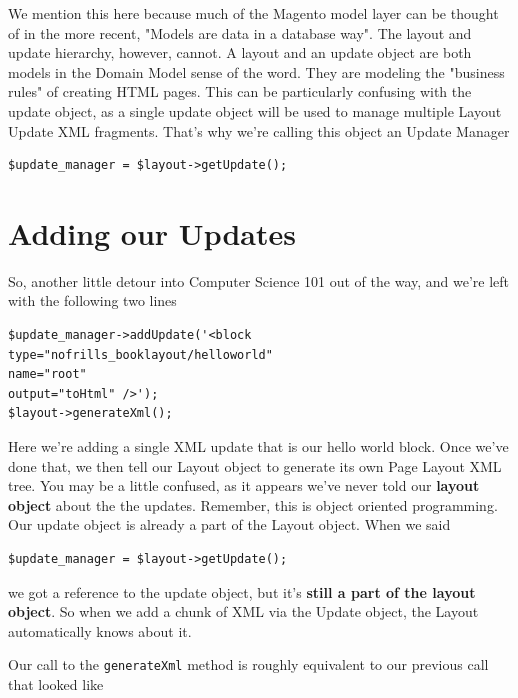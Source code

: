 \documentclass[oneside]{book}
\begin{document}
We mention this here because much of the Magento model layer can be thought of in the more recent, "Models are data in a database way".  The layout and update hierarchy, however, cannot.  A layout and an update object are both models in the Domain Model sense of the word.  They are modeling the "business rules" of creating HTML pages.  This can be particularly confusing with the update object, as a single update object will be used to manage multiple Layout Update XML fragments.  That's why we're calling this object an Update Manager

\begin{lstlisting}
$update_manager = $layout->getUpdate();         

\end{lstlisting}


\section{Adding our Updates}

So, another little detour into Computer Science 101 out of the way, and we're left with the following two lines

\begin{lstlisting}
$update_manager->addUpdate('<block 
type="nofrills_booklayout/helloworld" 
name="root" 
output="toHtml" />');           
$layout->generateXml();

\end{lstlisting}


Here we're adding a single XML update that is our hello world block.  Once we've done that, we then tell our Layout object to generate its own Page Layout XML tree.  You may be a little confused, as it appears we've never told our \textbf{layout object} about the the updates. Remember, this is object oriented programming.  Our update object is already a part of the Layout object.  When we said 

\begin{lstlisting}
$update_manager = $layout->getUpdate(); 

\end{lstlisting}


we got a reference to the update object, but it's \textbf{still a part of the layout object}.  So when we add a chunk of XML via the Update object, the Layout automatically knows about it.  

Our call to the \footnotesize\texttt{generateXml} \normalsize  method is roughly equivalent to our previous call that looked like
\end{document}
